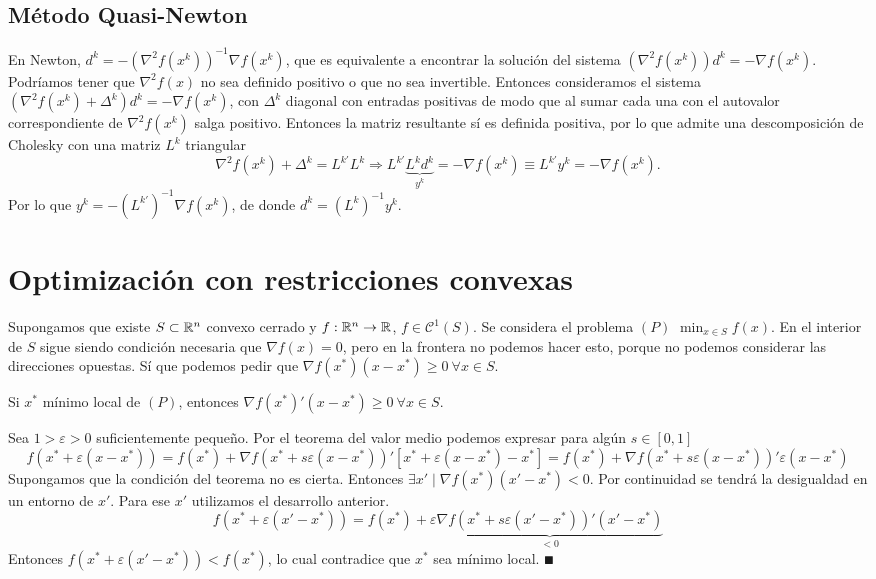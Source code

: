 \documentclass[MIOP.tex]{subfiles}
\begin{document}
\subsection{Método Quasi-Newton}
En Newton, $d^k=-(\nabla^2 f(x^k))^{-1}\nabla f(x^k)$, que es equivalente a encontrar la solución del sistema $(\nabla^2 f(x^k))d^k=-\nabla f(x^k)$.  Podríamos tener que $\nabla^2 f(x)$ no sea definido positivo o que no sea invertible. Entonces consideramos el sistema $(\nabla^2 f(x^k)+\Delta^k)d^k=-\nabla f(x^k)$, con $\Delta^k$ diagonal con entradas positivas de modo que al sumar cada una con el autovalor correspondiente de $\nabla^2 f(x^k)$ salga positivo. Entonces la matriz resultante sí es definida positiva, por lo que admite una descomposición de Cholesky con una matriz $L^k$ triangular
$$\nabla^2 f(x^k)+\Delta^k=L^{k'}L^k\Rightarrow L^{k'}\underbrace{L^kd^k}_{y^k}=-\nabla f(x^k)\equiv L^{k'}y^k=-\nabla f(x^k).$$
Por lo que $y^k=-(L^{k'})^{-1}\nabla f(x^k)$, de donde $d^k=(L^k)^{-1}y^k$.
\section{Optimización con restricciones convexas}
Supongamos que existe $S\subset\mathbb{R}^n$ convexo cerrado y $f:\mathbb{R}^n\to\mathbb{R}$, $f\in\mathcal{C}^1(S)$. Se considera el problema $(P)$ $\min_{x\in S} f(x)$. En el interior de $S$ sigue siendo condición necesaria que $\nabla f(x)=0$, pero en la frontera no podemos hacer esto, porque no podemos considerar las direcciones opuestas. Sí que podemos pedir que $\nabla f(x^*)(x-x^*)\geq 0\ \forall x\in S$. 
\begin{teorema}
Si $x^*$ mínimo local de $(P)$, entonces  $\nabla f(x^*)'(x-x^*)\geq 0\ \forall x\in S$.
\end{teorema}
\begin{dem}
Sea $1>\varepsilon>0$ suficientemente pequeño. Por el teorema del valor medio podemos expresar para algún $s\in[0,1]$
$$f(x^*+\varepsilon(x-x^*))=f(x^*)+\nabla f(x^*+s\varepsilon (x-x^*))'[x^*+\varepsilon(x-x^*)-x^*]=f(x^*)+\nabla f(x^*+s\varepsilon (x-x^*))'\varepsilon(x-x^*)$$
Supongamos que la condición del teorema no es cierta. Entonces $\exists x'\mid \nabla f(x^*)(x'-x^*)<0$. Por continuidad se tendrá la desigualdad en un entorno de $x'$. Para ese $x'$ utilizamos el desarrollo anterior. 
$$f(x^*+\varepsilon(x'-x^*))=f(x^*)+\varepsilon\underbrace{\nabla  f(x^*+s\varepsilon (x'-x^*))'(x'-x^*)}_{<0}$$
Entonces $f(x^*+\varepsilon(x'-x^*))< f(x^*)$, lo cual contradice que $x^*$ sea mínimo local. $\QED$
\end{dem}
\end{document}
